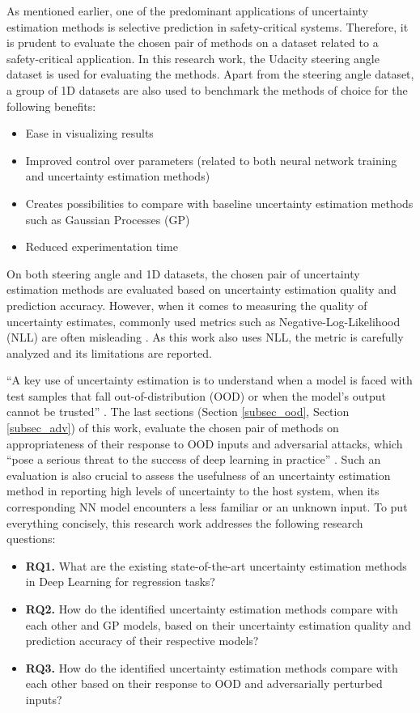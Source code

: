     
    As mentioned earlier, one of the predominant applications of uncertainty estimation methods is selective prediction in safety-critical systems. Therefore, it is prudent to evaluate the chosen pair of methods on a dataset related to a safety-critical application. In this research work, the Udacity steering angle dataset \cite{udasteer} is used for evaluating the methods. Apart from the steering angle dataset, a group of 1D datasets are also used to benchmark the methods of choice for the following benefits:
    \begin{itemize}
    	
    	\item Ease in visualizing results
    	\item Improved control over parameters (related to both neural network training and uncertainty estimation methods)
    	\item Creates possibilities to compare with baseline uncertainty estimation methods such as Gaussian Processes (GP)
    	\item Reduced experimentation time
    \end{itemize}
	On both steering angle and 1D datasets, the chosen pair of uncertainty estimation methods are evaluated based on uncertainty estimation quality and prediction accuracy. However, when it comes to measuring the quality of uncertainty estimates, commonly used metrics such as Negative-Log-Likelihood (NLL) are often misleading \cite{yao2019quality}. As this work also uses NLL, the metric is carefully analyzed and its limitations are reported.
	
	\enquote{A key use of uncertainty estimation is to understand when a model is faced with test samples that fall out-of-distribution (OOD) or when the model's output cannot be trusted} \cite{amini2020deep}.
	The last sections (Section \ref{subsec_ood}, Section \ref{subsec_adv}) of this work, evaluate the chosen pair of methods on appropriateness of their response to OOD inputs and adversarial attacks, which \enquote{pose a serious threat to the success of deep learning in practice} \cite{akhtar2018threat}. Such an evaluation is also crucial to assess the usefulness of an uncertainty estimation method in reporting high levels of uncertainty to the host system, when its corresponding NN model encounters a less familiar or an unknown input.
	To put everything concisely, this research work addresses the following research questions:
	\begin{itemize}
		\item \textbf{RQ1. }What are the existing state-of-the-art uncertainty estimation
		methods in Deep Learning for regression tasks?
		\item \textbf{RQ2. }How do the identified uncertainty estimation methods compare
		with each other and GP models, based on their uncertainty estimation quality and prediction accuracy of their respective models?
		\item \textbf{RQ3. }How do the identified uncertainty estimation methods compare with each other based on their response to OOD and adversarially perturbed inputs?
	\end{itemize}

